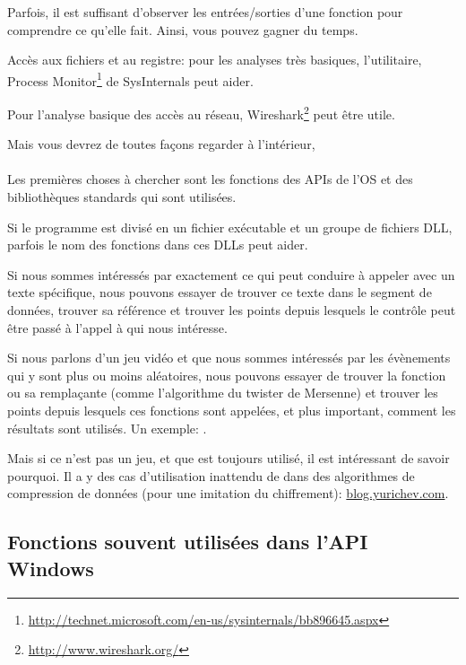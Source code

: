 
Parfois, il est suffisant d'observer les entrées/sorties d'une fonction pour comprendre
ce qu'elle fait.
Ainsi, vous pouvez gagner du temps.

Accès aux fichiers et au registre:
pour les analyses très basiques, l'utilitaire, Process Monitor\footnote{\url{http://technet.microsoft.com/en-us/sysinternals/bb896645.aspx}}
de SysInternals peut aider.

Pour l'analyse basique des accès au réseau, Wireshark\footnote{\url{http://www.wireshark.org/}}
peut être utile.

Mais vous devrez de toutes façons regarder à l'intérieur, \\
\\
Les premières choses à chercher sont les fonctions des \ac{API}s de l'\ac{OS} et
des bibliothèques standards qui sont utilisées.

Si le programme est divisé en un fichier exécutable et un groupe de fichiers DLL,
parfois le nom des fonctions dans ces DLLs peut aider.

Si nous sommes intéressés par exactement ce qui peut conduire à appeler 
avec un texte spécifique, nous pouvons essayer de trouver ce texte dans le segment
de données, trouver sa référence et trouver les points depuis lesquels le contrôle
peut être passé à l'appel à  qui nous intéresse.

Si nous parlons d'un jeu vidéo et que nous sommes intéressés par les évènements qui
y sont plus ou moins aléatoires, nous pouvons essayer de trouver la fonction \rand
ou sa remplaçante (comme l'algorithme du twister de Mersenne) et trouver les points
depuis lesquels ces fonctions sont appelées, et plus important, comment les résultats
sont utilisés.
Un exemple: .

Mais si ce n'est pas un jeu, et que \rand est toujours utilisé, il est intéressant
de savoir pourquoi.
Il a y des cas d'utilisation inattendu de \rand dans des algorithmes de compression
de données (pour une imitation du chiffrement):
\href{http://blog.yurichev.com/node/44}{blog.yurichev.com}.

\subsection{Fonctions souvent utilisées dans l'API Windows}

